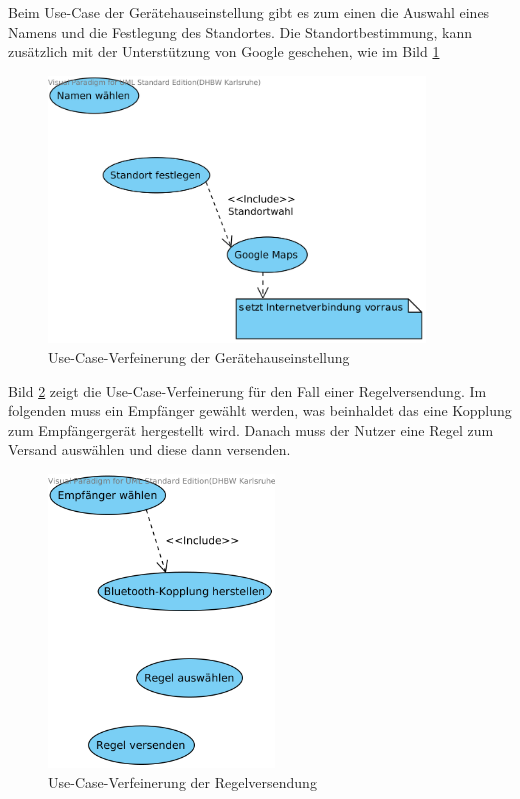 Beim Use-Case der Ger\"atehauseinstellung gibt es zum einen die Auswahl eines Namens und die Festlegung des Standortes. Die Standortbestimmung, kann zus\"atzlich mit der Unterst\"utzung von Google geschehen, wie im Bild \ref{Geraetehauseinstellung Use Case}
\begin{figure}[!ht]
\centering
\includegraphics[width=10cm]{Bilder/UseCaseGeraetehauseinstellung.png}
\caption{Use-Case-Verfeinerung der Ger\"atehauseinstellung}
\label{Geraetehauseinstellung Use Case}
\centering
\end{figure}

\newpage

Bild \ref{Regelversendung Use Case} zeigt die Use-Case-Verfeinerung f\"ur den Fall einer Regelversendung. Im folgenden muss ein Empf\"anger gew\"ahlt werden, was beinhaldet das eine Kopplung zum Empf\"angerger\"at hergestellt wird. Danach muss der Nutzer eine Regel zum Versand ausw\"ahlen und diese dann versenden. 
\begin{figure}[!ht]
\centering
\includegraphics[width=6cm]{Bilder/UseCaseRegelVersenden.png}
\caption{Use-Case-Verfeinerung der Regelversendung}
\label{Regelversendung Use Case}
\centering
\end{figure}

